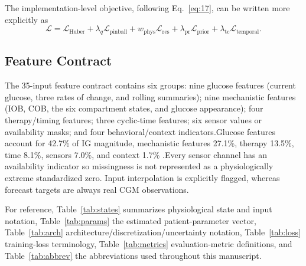 \documentclass[journal]{IEEEtran}
\begin{document}
The implementation-level objective, following Eq.~\eqref{eq:17}, can be written more explicitly as
\begin{equation}
\mathcal{L} = \mathcal{L}_{\text{Huber}} + \lambda_q \mathcal{L}_{\text{pinball}} + w_{\text{phys}} \mathcal{L}_{\text{res}} + \lambda_{\text{pr}} \mathcal{L}_{\text{prior}} + \lambda_{\text{tc}} \mathcal{L}_{\text{temporal}}.
\label{eq:22}
\end{equation}

\subsection{Feature Contract}

The 35-input feature contract contains six groups: nine glucose features (current glucose, three rates of change, and rolling summaries); nine mechanistic features (IOB, COB, the six compartment states, and glucose appearance); four therapy/timing features; three cyclic-time features; six sensor values or availability masks; and four behavioral/context indicators.Glucose features account for 42.7\% of IG magnitude, mechanistic features 27.1\%, therapy 13.5\%, time 8.1\%, sensors 7.0\%, and context 1.7\% .Every sensor channel has an availability indicator so missingness is not represented as a physiologically extreme standardized zero. Input interpolation is explicitly flagged, whereas forecast targets are always real CGM observations.

For reference, Table~\ref{tab:states} summarizes physiological state and input notation, Table~\ref{tab:params} the estimated patient-parameter vector, Table~\ref{tab:arch} architecture/discretization/uncertainty notation, Table~\ref{tab:loss} training-loss terminology, Table~\ref{tab:metrics} evaluation-metric definitions, and Table~\ref{tab:abbrev} the abbreviations used throughout this manuscript.
\end{document}
